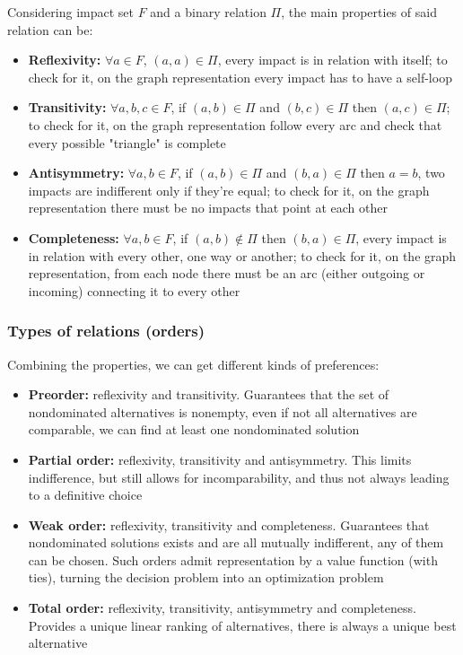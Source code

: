 Considering impact set $F$ and a binary relation $\Pi$, the main properties of said relation can be:
\begin{itemize}
	\item \textbf{Reflexivity:} $\forall a \in F$, $(a,a) \in \Pi$, every impact is in relation with itself; to check for it, on the graph representation every impact has to have a self-loop
	
	\item \textbf{Transitivity:} $\forall a,b,c \in F$, if $(a,b) \in \Pi$ and $(b,c) \in \Pi$ then $(a,c) \in \Pi$; to check for it, on the graph representation follow every arc and check that every possible "triangle" is complete
	
	\item \textbf{Antisymmetry:} $\forall a,b \in F$, if $(a,b) \in \Pi$ and $(b,a) \in \Pi$ then $a = b$, two impacts are indifferent only if they're equal; to check for it, on the graph representation there must be no impacts that point at each other
	
	\item \textbf{Completeness:} $\forall a,b \in F$, if $(a,b) \notin \Pi$ then $(b, a) \in \Pi$, every impact is in relation with every other, one way or another; to check for it, on the graph representation, from each node there must be an arc (either outgoing or incoming) connecting it to every other
\end{itemize}

\subsubsection{Types of relations (orders)}

Combining the properties, we can get different kinds of preferences: 
\begin{itemize}
	\item \textbf{Preorder:} reflexivity and transitivity. Guarantees that the set of nondominated alternatives is nonempty, even if not all alternatives are comparable, we can find at least one nondominated solution
	
	\item \textbf{Partial order:} reflexivity, transitivity and antisymmetry. This limits indifference, but still allows for incomparability, and thus not always leading to a definitive choice
	
	\item \textbf{Weak order:} reflexivity, transitivity and completeness. Guarantees that nondominated solutions exists and are all mutually indifferent, any of them can be chosen. Such orders admit representation by a value function (with ties), turning the decision problem into an optimization problem
	
	\item \textbf{Total order:} reflexivity, transitivity, antisymmetry and completeness. Provides a unique linear ranking of alternatives, there is always a unique best alternative
\end{itemize}

